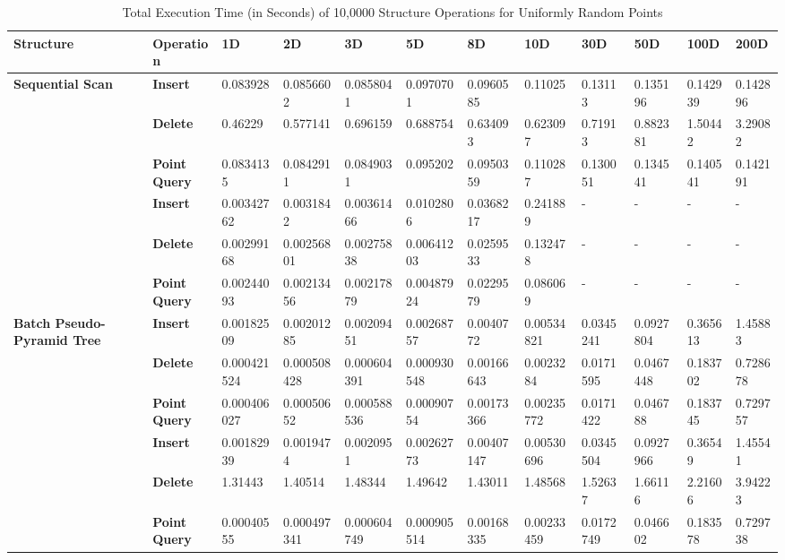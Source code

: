 \begin{landscape}

	\begin{table}
		\centering
		\begin{tabular}{|p{2cm}|l|l|l|l|l|l|l|l|l|l|l|}
			\hline
			\textbf{Structure} & \textbf{Operation} & \textbf{1D} & \textbf{2D} & \textbf{3D} & \textbf{5D} & \textbf{8D} & \textbf{10D} & \textbf{30D} & \textbf{50D} & \textbf{100D} & \textbf{200D} \\
			\hline
			\multirow{ 4}{*}{\textbf{Sequential Scan}} & \textbf{Insert} & 0.083928 & 0.0856602 & 0.0858041 & 0.0970701 & 0.0960585 & 0.11025 & 0.13113 & 0.135196 & 0.142939 & 0.142896 \\ & \textbf{Delete} & 0.46229 & 0.577141 & 0.696159 & 0.688754 & 0.634093 & 0.623097 & 0.71913 & 0.882381 & 1.50442 & 3.29082 \\ & \textbf{Point Query} & 0.0834135 & 0.0842911 & 0.0849031 & 0.095202 & 0.0950359 & 0.110287 & 0.130051 & 0.134541 & 0.140541 & 0.142191 \\
			\hline
			\multirow{ 4}{*}{\textbf{Octree}} & \textbf{Insert} & 0.00342762 & 0.0031842 & 0.00361466 & 0.0102806 & 0.0368217 & 0.241889 & - & - & - & - \\ & \textbf{Delete} & 0.00299168 & 0.00256801 & 0.00275838 & 0.00641203 & 0.0259533 & 0.132478 & - & - & - & - \\ & \textbf{Point Query} & 0.00244093 & 0.00213456 & 0.00217879 & 0.00487924 & 0.0229579 & 0.086069 & - & - & - & - \\
			\hline
			\multirow{ 4}{*}{\textbf{Batch Pseudo-Pyramid Tree}} & \textbf{Insert} & 0.00182509 & 0.00201285 & 0.00209451 & 0.00268757 & 0.0040772 & 0.00534821 & 0.0345241 & 0.0927804 & 0.365613 & 1.45883 \\ & \textbf{Delete} & 0.000421524 & 0.000508428 & 0.000604391 & 0.000930548 & 0.00166643 & 0.0023284 & 0.0171595 & 0.0467448 & 0.183702 & 0.728678 \\ & \textbf{Point Query} & 0.000406027 & 0.00050652 & 0.000588536 & 0.00090754 & 0.00173366 & 0.00235772 & 0.0171422 & 0.046788 & 0.183745 & 0.729757 \\
			\hline
			\multirow{ 4}{*}{\textbf{Defragmented Pseudo-Pyramid Tree}} & \textbf{Insert} & 0.00182939 & 0.0019474 & 0.0020951 & 0.00262773 & 0.00407147 & 0.00530696 & 0.0345504 & 0.0927966 & 0.36549 & 1.45541 \\ & \textbf{Delete} & 1.31443 & 1.40514 & 1.48344 & 1.49642 & 1.43011 & 1.48568 & 1.52637 & 1.66116 & 2.21606 & 3.94223 \\ & \textbf{Point Query} & 0.00040555 & 0.000497341 & 0.000604749 & 0.000905514 & 0.00168335 & 0.00233459 & 0.0172749 & 0.046602 & 0.183578 & 0.729738 \\
			\hline
		\end{tabular}
		\caption{Total Execution Time (in Seconds) of 10,0000 Structure Operations for Uniformly Random Points}
		\label{tab:perf1-randuniform}
	\end{table}


\end{landscape}
